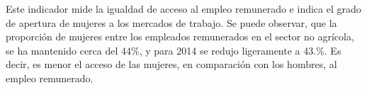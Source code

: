 Este indicador mide la igualdad de acceso al empleo remunerado e indica el grado de apertura de mujeres a los mercados de trabajo. Se puede observar, que la proporción de mujeres entre los empleados remunerados en el sector no agrícola, se ha mantenido cerca del 44\%, y para 2014 se redujo ligeramente a 43.\%. Es decir, es menor el acceso de las mujeres, en comparación con los hombres, al empleo remunerado.